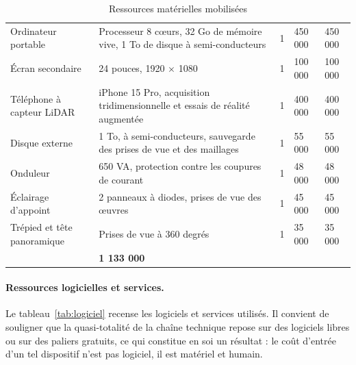 \begin{table}[htbp]
\centering
\caption{Ressources matérielles mobilisées}
\label{tab:materiel}
\small
\begin{tabularx}{\textwidth}{|L{3.2cm}|X|C{1.3cm}|R{2.0cm}|R{2.0cm}|}
\hline
{}
 &  &  &  &  \\ \hline
Ordinateur portable & Processeur 8 cœurs, 32 Go de mémoire vive, 1 To de disque à semi-conducteurs & 1 & 450 000 & 450 000 \\ \hline
Écran secondaire & 24 pouces, 1920 $\times$ 1080 & 1 & 100 000 & 100 000 \\ \hline
Téléphone à capteur LiDAR & iPhone 15 Pro, acquisition tridimensionnelle et essais de réalité augmentée & 1 & 400 000 & 400 000 \\ \hline
Disque externe & 1 To, à semi-conducteurs, sauvegarde des prises de vue et des maillages & 1 & 55 000 & 55 000 \\ \hline
Onduleur & 650 VA, protection contre les coupures de courant & 1 & 48 000 & 48 000 \\ \hline
Éclairage d'appoint & 2 panneaux à diodes, prises de vue des œuvres & 1 & 45 000 & 45 000 \\ \hline
Trépied et tête panoramique & Prises de vue à 360 degrés & 1 & 35 000 & 35 000 \\ \hline
{}
 & \textbf{1 133 000} \\ \hline
\end{tabularx}
\end{table}

\paragraph{Ressources logicielles et services.}

Le tableau~\ref{tab:logiciel} recense les logiciels et services utilisés. Il
convient de souligner que la quasi-totalité de la chaîne technique repose sur
des logiciels libres ou sur des paliers gratuits, ce qui constitue en soi un
résultat : le coût d'entrée d'un tel dispositif n'est pas logiciel, il est
matériel et humain.

